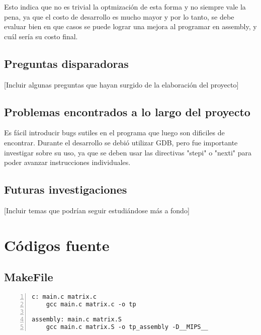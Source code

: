 \documentclass[11pt,a4paper]{article}
\begin{document}
Esto indica que no es trivial la optmizaci\'on de esta forma y no siempre
vale la pena, ya que el costo de desarrollo es mucho mayor y por lo tanto, se
debe evaluar bien en que casos se puede lograr una mejora al programar en
assembly, y cu\'al ser\'ia su costo final.

\subsection{Preguntas disparadoras}

[Incluir algunas preguntas que hayan surgido de la elaboraci\'on del proyecto]

\subsection{Problemas encontrados a lo largo del proyecto}

Es f\'acil introducir bugs sutiles en el programa que luego son dificiles de 
encontrar. Durante el desarrollo se debi\'o utilizar GDB, pero fue importante
investigar sobre su uso, ya que se deben usar las directivas "stepi" o "nexti"
para poder avanzar instrucciones individuales.

\subsection{Futuras investigaciones}

[Incluir temas que podr\'ian seguir estudi\'andose m\'as a fondo]



\section{C\'odigos fuente}

\subsection{MakeFile}

\begin{lstlisting}[numbers=left, tabsize=2, basicstyle=\fontsize{11}{13}\ttfamily, frame=single, caption={makefile}]
c: main.c matrix.c
	gcc main.c matrix.c -o tp

assembly: main.c matrix.S
	gcc main.c matrix.S -o tp_assembly -D__MIPS__

\end{lstlisting}
\end{document}
